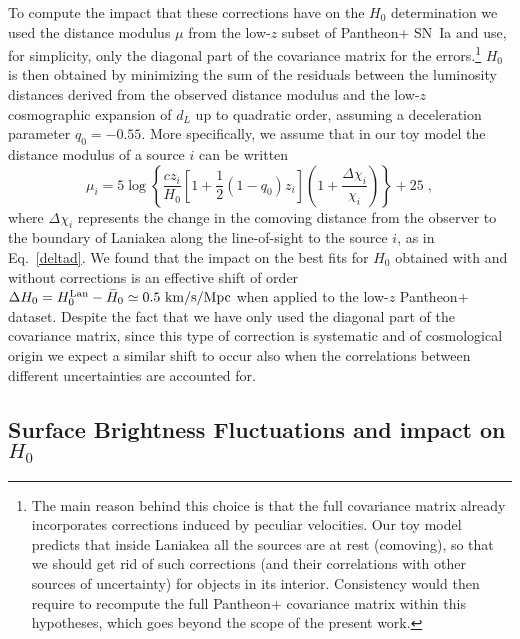 \documentclass[notitlepage,nofootinbib]{revtex4-1}
\begin{document}
To compute the impact that these corrections have on the $H_0$ determination we used the distance modulus $\mu$ from the low-$z$ subset of Pantheon+ SN~Ia and use, for simplicity, only the diagonal part of the covariance matrix for the errors.\footnote{The main reason behind this choice is that the full covariance matrix already incorporates corrections induced by peculiar velocities. Our toy model predicts that inside Laniakea all the sources are at rest (comoving), so that we should get rid of such corrections (and their correlations with other sources of uncertainty) for objects in its interior. Consistency would then require to recompute the full Pantheon+ covariance matrix within this hypotheses, which goes beyond the scope of the present work.} $H_0$ is then obtained by minimizing the sum of the residuals between the luminosity distances derived from the observed distance modulus and the low-$z$ cosmographic expansion of $d_L$ \cite{Visser:2004bf} up to quadratic order, assuming a deceleration parameter $q_0 = -0.55$.  More specifically, we assume that in our toy model the distance modulus of a source $i$ can be written
\begin{equation}
    \mu_i = 5\log{\left\{\frac{cz_i}{H_0}\left[1+\frac{1}{2}\left(1-q_0\right)z_i\right] \left(1+\frac{\Delta \chi_i}{\chi_i}\right)\right\}    }+25\;,
\end{equation}
where $\Delta \chi_i$ represents the change in the comoving distance from the observer to the boundary of Laniakea along the line-of-sight to the source $i$, as in Eq.~\eqref{deltad}.
 We found that the impact on the best fits for $H_0$ obtained with and without corrections is an effective shift of order $\Delta H_0 = H_0^{\rm{Lan}} -\bar{H}_0 \simeq 0.5~\rm{km}/ \rm{s} / \rm{Mpc}$ when applied to the low-$z$ Pantheon+ dataset. Despite the fact that we have only used the diagonal part of the covariance matrix, since this type of correction is systematic and of cosmological origin we expect a similar shift to occur  also when the correlations between different uncertainties are accounted for.     

\subsection{Surface Brightness Fluctuations and impact on $H_0$}
\end{document}
